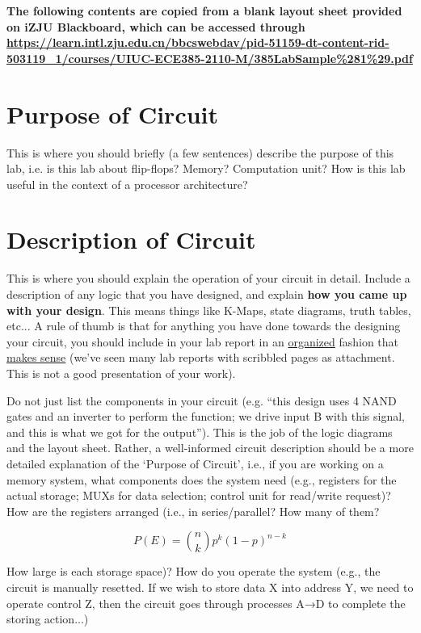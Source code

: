 \documentclass[a4paper]{article}
\begin{document}
    \maketitlepage

    {\bfseries The following contents are copied from a blank layout sheet provided on iZJU Blackboard, which can be accessed through \url{https://learn.intl.zju.edu.cn/bbcswebdav/pid-51159-dt-content-rid-503119_1/courses/UIUC-ECE385-2110-M/385LabSample%281%29.pdf} }

    \section{Purpose of Circuit}
    This is where you should briefly (a few sentences) describe the purpose of this lab, i.e. is 
    this lab about flip-flops? Memory? Computation unit? How is this lab useful in the 
    context of a processor architecture?

    \section{Description of Circuit}
    This is where you should explain the operation of your circuit in detail. Include a 
    description of any logic that you have designed, and explain \textbf{how you came up with 
    your design}. This means things like K-Maps, state diagrams, truth tables, etc... A rule 
    of thumb is that for anything you have done towards the designing your circuit, you 
    should include in your lab report in an \underline{organized} fashion that \underline{makes sense} (we've seen 
    many lab reports with scribbled pages as attachment. This is not a good presentation of 
    your work).

    Do not just list the components in your circuit (e.g. ``this design uses 4 NAND gates and 
    an inverter to perform the function; we drive input B with this signal, and this is what we 
    got for the output''). This is the job of the logic diagrams and the layout sheet. Rather, a 
    well-informed circuit description should be a more detailed explanation of the `Purpose 
    of Circuit', i.e., if you are working on a memory system, what components does the 
    system need (e.g., registers for the actual storage; MUXs for data selection; control unit 
    for read/write request)? How are the registers arranged (i.e., in series/parallel? How 
    many of them?
    
    \[P(E) = {n \choose k} p^k (1-p)^{ n-k} \]

    How large is each storage space)? How do you operate the system (e.g., 
    the circuit is manually resetted. If we wish to store data X into address Y, we need to 
    operate control Z, then the circuit goes through processes A→D to complete the storing 
    action...)
\end{document}
